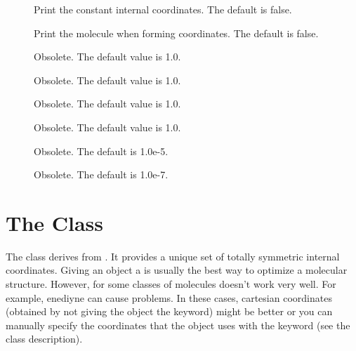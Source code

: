 \begin{description}
  \item[] Print the constant internal
     coordinates.  The default is false.
               
  \item[] Print the molecule when forming
     coordinates.  The default is false.
               
  \item[] Obsolete.  The default value is 1.0.

  \item[] Obsolete.  The default value is 1.0.
               
  \item[] Obsolete.  The default value is 1.0.

  \item[] Obsolete.  The default value is 1.0.

  \item[] Obsolete.  The default is 1.0e-5.

  \item[] Obsolete.  The default is 1.0e-7.

\end{description}



\section{The  Class}\label{SymmMolecularCoor}

The  class derives from
.  It provides a unique set of totally symmetric
internal coordinates.  Giving an  object a
 is usually the best way to optimize a molecular structure.
However, for some classes of molecules  doesn't
work very well.  For example, enediyne can cause problems.  In these cases,
cartesian coordinates (obtained by not giving the
 object the  keyword) might be better
or you can manually specify the coordinates that the
 object uses with the  keyword
(see the  class description).

